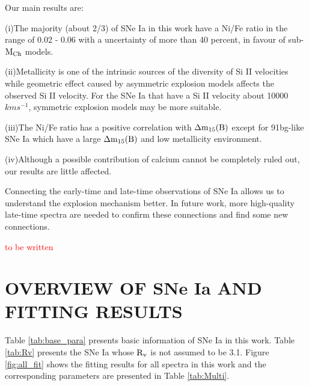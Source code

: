 \documentclass[twocolumn]{aastex631}
\begin{document}
Our main results are:

(i)The majority (about 2/3) of SNe Ia in this work have a Ni/Fe ratio in the range of 0.02 - 0.06 with a uncertainty of more than 40 percent, in favour of sub-$\rm M_{Ch}$ models.   

(ii)Metallicity is one of the intrinsic sources of the diversity of Si II velocities while geometric effect caused by asymmetric explosion models affects the observed Si II velocity. For the SNe Ia that have a Si II velocity about 10000 $km s^{-1}$, symmetric explosion models may be more suitable. 

(iii)The Ni/Fe ratio has a positive correlation with $\rm {\Delta}m_{15}(B)$ except for 91bg-like SNe Ia which have a large $\rm {\Delta}m_{15}(B)$ and low metallicity environment. 

(iv)Although a possible contribution of calcium cannot be completely ruled out, our results are little affected.

Connecting the early-time and late-time observations of SNe Ia allows us to understand the explosion mechanism better. In future work, more high-quality late-time spectra are needed to confirm these connections and find some new connections. 

\begin{acknowledgments}
\textcolor{red}{to be written}
\end{acknowledgments}

{}


\appendix

\section{OVERVIEW OF SNe Ia AND FITTING RESULTS} \label{sec:spectra}

Table \ref{tab:base_para} presents basic information of SNe Ia in this work. Table \ref{tab:Rv} presents the SNe Ia whose $\rm R_v$ is not assumed to be 3.1. Figure \ref{fig:all_fit} shows the fitting results for all spectra in this work and the corresponding parameters are presented in Table \ref{tab:Multi}.  
\end{document}
